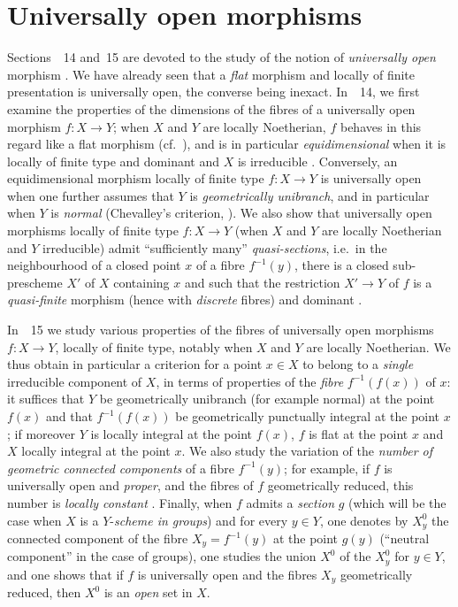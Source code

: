 \section{Universally open morphisms}
\label{section:IV.14}



Sections~\textsection\textsection~14 and~15 are devoted to the study of the notion of \emph{universally open} morphism .
We have already seen  that a \emph{flat} morphism and locally of finite presentation is universally open, the converse being inexact.
In~\textsection~14, we first examine the properties of the dimensions of the fibres of a universally open morphism $f:X\to Y$; when $X$ and $Y$ are locally Noetherian, $f$ behaves in this regard  like a flat morphism (cf.~), and is in particular \emph{equidimensional} when it is locally of finite type and dominant and $X$ is irreducible .
Conversely, an equidimensional morphism locally of finite type $f:X\to Y$ is universally open when one further assumes that $Y$ is \emph{geometrically unibranch}, and in particular when $Y$ is \emph{normal} (Chevalley's criterion, ).
We also show that universally open morphisms locally of finite type $f:X\to Y$ (when $X$ and $Y$ are locally Noetherian and $Y$ irreducible) admit ``sufficiently many'' \emph{quasi-sections}, i.e.\ in the neighbourhood of a closed point $x$ of a fibre $f^{-1}(y)$, there is a closed sub-prescheme $X'$ of $X$ containing $x$ and such that the restriction $X'\to Y$ of $f$ is a \emph{quasi-finite} morphism (hence with \emph{discrete} fibres) and dominant .


In~\textsection~15 we study various properties of the fibres of universally open morphisms $f:X\to Y$, locally of finite type, notably when $X$ and $Y$ are locally Noetherian.
We thus obtain in particular a criterion for a point $x\in X$ to belong to a \emph{single} irreducible component of $X$, in terms of properties of the \emph{fibre} $f^{-1}(f(x))$ of $x$: it suffices that $Y$ be geometrically unibranch (for example normal) at the point $f(x)$ and that $f^{-1}(f(x))$ be geometrically punctually integral at the point $x$ ; if moreover $Y$ is locally integral at the point $f(x)$, $f$ is flat at the point $x$ and $X$ locally integral at the point $x$.
We also study the variation of the \emph{number of geometric connected components} of a fibre $f^{-1}(y)$; for example, if $f$ is universally open and \emph{proper}, and the fibres of $f$ geometrically reduced, this number is \emph{locally constant} .
Finally, when $f$ admits a \emph{section} $g$ (which will be the case when $X$ is a $Y$-\emph{scheme in groups}) and for every $y\in Y$, one denotes by $X_y^0$ the connected component of the fibre $X_y=f^{-1}(y)$ at the point $g(y)$ (``neutral component'' in the case of groups), one studies the union $X^0$ of the $X_y^0$ for $y\in Y$, and one shows  that if $f$ is universally open and the fibres $X_y$ geometrically reduced, then $X^0$ is an \emph{open} set in $X$.


